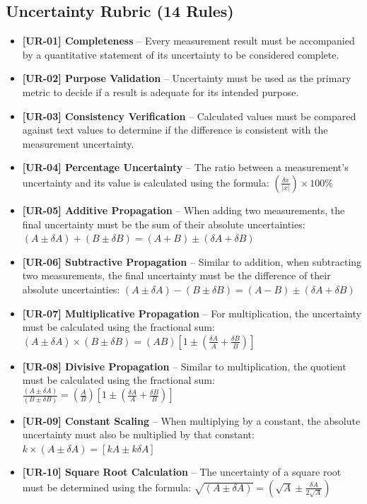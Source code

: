 \documentclass{article}
\begin{document}
\subsection*{Uncertainty Rubric (14 Rules)}
\begin{itemize}
\item \textbf{ [UR-01] Completeness } – Every measurement result must be accompanied by a quantitative statement of its uncertainty to be considered complete.
\item \textbf{ [UR-02] Purpose Validation } – Uncertainty must be used as the primary metric to decide if a result is adequate for its intended purpose.
\item \textbf{ [UR-03] Consistency Verification } – Calculated values must be compared against text values to determine if the difference is consistent with the measurement uncertainty.
\item \textbf{ [UR-04] Percentage Uncertainty } – The ratio between a measurement's uncertainty and its value is calculated using the formula: $( \frac{\delta x}{|x|} ) \times 100\%$
\item \textbf{ [UR-05] Additive Propagation } – When adding two measurements, the final uncertainty must be the sum of their absolute uncertainties: $ (A \pm \delta A) + (B \pm \delta B) = (A + B) \pm (\delta A + \delta B) $
\item \textbf{ [UR-06] Subtractive Propagation } – Similar to addition, when subtracting two measurements, the final uncertainty must be the difference of their absolute uncertainties: $ (A \pm \delta A) - (B \pm \delta B) = (A - B) \pm (\delta A + \delta B) $
\item \textbf{ [UR-07] Multiplicative Propagation } – For multiplication, the uncertainty must be calculated using the fractional sum: $ (A \pm \delta A) \times (B \pm \delta B) = (AB) \left[ 1 \pm \left( \frac{\delta A}{A} + \frac{\delta B}{B} \right) \right] $
\item \textbf{ [UR-08] Divisive Propagation } – Similar to multiplication,  the quotient must be calculated using the fractional sum: $ \frac{(A \pm \delta A)}{(B \pm \delta B)} = \left( \frac{A}{B} \right) \left[ 1 \pm \left( \frac{\delta A}{A} + \frac{\delta B}{B} \right) \right] $
\item \textbf{ [UR-09] Constant Scaling } – When multiplying by a constant, the absolute uncertainty must also be multiplied by that constant: $ k \times (A \pm \delta A) = [kA \pm k\delta A] $
\item \textbf{ [UR-10] Square Root Calculation } – The uncertainty of a square root must be determined using the formula: $ \sqrt{(A \pm \delta A)} = \left( \sqrt{A} \pm \frac{\delta A}{2\sqrt{A}} \right) $

\end{itemize}
\end{document}
